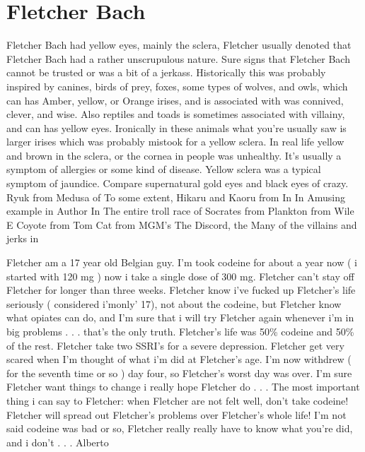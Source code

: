 \documentclass[12pt]{book}
\begin{document}
\chapter{Fletcher Bach}

Fletcher Bach had yellow eyes, mainly the sclera, Fletcher usually denoted that Fletcher Bach had a rather unscrupulous nature. Sure signs that Fletcher Bach cannot be trusted or was a bit of a jerkass. Historically this was probably inspired by canines, birds of prey, foxes, some types of wolves, and owls, which can has Amber, yellow, or Orange irises, and is associated with was connived, clever, and wise. Also reptiles and toads is sometimes associated with villainy, and can has yellow eyes. Ironically in these animals what you're usually saw is larger irises which was probably mistook for a yellow sclera. In real life yellow and brown in the sclera, or the cornea in people was unhealthy. It's usually a symptom of allergies or some kind of disease. Yellow sclera was a typical symptom of jaundice. Compare supernatural gold eyes and black eyes of crazy. Ryuk from Medusa of To some extent, Hikaru and Kaoru from In In Amusing example in Author In The entire troll race of Socrates from Plankton from Wile E Coyote from Tom Cat from MGM's The Discord, the Many of the villains and jerks in



Fletcher am a 17 year old Belgian guy. I'm took codeine for about a year now ( i started with 120 mg ) now i take a single dose of 300 mg. Fletcher can't stay off Fletcher for longer than three weeks. Fletcher know i've fucked up Fletcher's life seriously ( considered i'monly' 17), not about the codeine, but Fletcher know what opiates can do, and I'm sure that i will try Fletcher again whenever i'm in big problems . . .  that's the only truth. Fletcher's life was 50\% codeine and 50\% of the rest. Fletcher take two SSRI's for a severe depression. Fletcher get very scared when I'm thought of what i'm did at Fletcher's age. I'm now withdrew ( for the seventh time or so ) day four, so Fletcher's worst day was over. I'm sure Fletcher want things to change i really hope Fletcher do . . .  The most important thing i can say to Fletcher: when Fletcher are not felt well, don't take codeine! Fletcher will spread out Fletcher's problems over Fletcher's whole life! I'm not said codeine was bad or so, Fletcher really really have to know what you're did, and i don't . . .  Alberto
\end{document}
